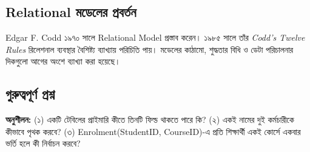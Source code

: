 \subsection{Relational মডেলের প্রবর্তন}
Edgar F. Codd ১৯৭০ সালে Relational Model প্রস্তাব করেন। ১৯৮৫ সালে তাঁর \textit{Codd's Twelve Rules} রিলেশনাল ব্যবস্থার বৈশিষ্ট্য ব্যাখ্যায় পরিচিতি পায়। মডেলের কাঠামো, শুদ্ধতার বিধি ও ডেটা পরিচালনার দিকগুলো আগের অংশে ব্যাখ্যা করা হয়েছে।

\subsection{গুরুত্বপূর্ণ প্রশ্ন}
\textbf{অনুশীলন:} (১) একটি টেবিলের প্রাইমারি কীতে তিনটি ফিল্ড থাকতে পারে কি? (২) একই নামের দুই কর্মচারীকে কীভাবে পৃথক করবে? (৩) Enrolment(StudentID, CourseID)-এ প্রতি শিক্ষার্থী একই কোর্সে একবার ভর্তি হলে কী নির্বাচন করবে?\par



